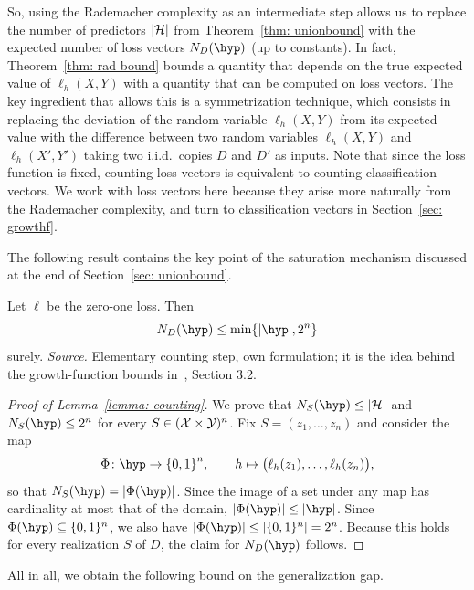 \documentclass[reqno]{amsart}
\begin{document}
So, using the Rademacher complexity as an intermediate step allows us to replace the number of predictors $\vert\mathcal{H}\vert$ from Theorem~\ref{thm: unionbound} with the expected number of loss vectors $N_D(\hyp)$ (up to constants). 
In fact, Theorem~\ref{thm: rad bound} bounds a quantity that depends on the true expected value of $\ell_h(X,Y)$ with a quantity that can be computed on loss vectors. The key ingredient that allows this is a symmetrization technique, which consists in replacing the deviation of the random variable $\ell_h(X,Y)$ from its expected value with the difference between two random variables $\ell_h(X,Y)$ and $\ell_h(X',Y')$ taking two i.i.d.\ copies $D$ and $D'$ as inputs. Note that since the loss function is fixed, counting loss vectors is equivalent to counting classification vectors. We work with loss vectors here because they arise more naturally from the Rademacher complexity, and turn to classification vectors in Section~\ref{sec: growthf}. 

The following result contains the key point of the saturation mechanism discussed at the end of Section~\ref{sec: unionbound}. 

\begin{lemma}[Counting]\label{lemma: counting} Let $\ell$ be the zero-one loss. Then
\[
N_{D}(\hyp) \le \min\{\vert\hyp\vert, 2^n\} 
\]
surely.
\textnormal{\emph{Source.} Elementary counting step, own formulation; it is the idea behind the growth-function bounds in~\cite{mohri2018foundations}, Section 3.2.}

\begin{proof}[Proof of Lemma~\ref{lemma: counting}]
  We prove that $N_S(\hyp)\le \card$ and $N_S(\hyp)\le 2^n$ for every $S\in(\mathcal{X}\times\mathcal{Y})^n$.
Fix $S=(z_1,\dots,z_n)$ and consider the map
\[
\Phi\colon \hyp \to {\{0,1\}}^n,\qquad
h \mapsto \bigl(\ell_h(z_1),\dots,\ell_h(z_n)\bigr),
\]
so that $N_S(\hyp)=|\Phi(\hyp)|$. Since the image of a set under any map
has cardinality at most that of the domain, $|\Phi(\hyp)|\le|\hyp|$.
Since $\Phi(\hyp)\subseteq\{0,1\}^n$, we also have
$|\Phi(\hyp)|\le|\{0,1\}^n|=2^n$. Because this holds for every realization $S$ of $D$, the claim for $N_D(\hyp)$ follows. 
\end{proof}
\end{lemma} 


All in all, we obtain the following bound on the generalization gap. 
\end{document}
